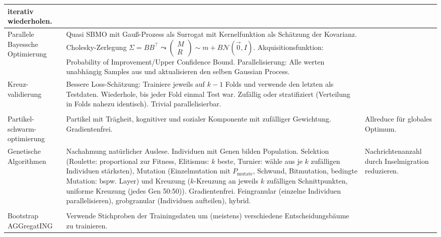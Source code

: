\documentclass[11pt]{scrartcl}
\begin{document}
\begin{xltabular}{\linewidth}{p{25mm}|p{70mm}p{35mm}}
        iterativ wiederholen. &
        \\
    \hline
    Parallele Bayessche Optimierung &
        Quasi SBMO mit Gauß-Prozess als Surrogat mit Kernelfunktion als Schätzung der 
        Kovarianz. Cholesky-Zerlegung $\Sigma = B B^\top \leadsto \begin{pmatrix}
            M \\ R
        \end{pmatrix} \sim m + B \mathcal{N}(\vec{0}, I)$. Akquisitionsfunktion: Probability of 
        Improvement/Upper Confidence Bound. Parallelisierung: Alle werten unabhängig Samples aus
        und aktualisieren den selben Gaussian Process. & 
        \\
    \hline
    Kreuz-validierung &
        Bessere Loss-Schätzung: Trainiere jeweils auf $k - 1$ Folds und verwende den letzten
        als Testdaten. Wiederhole, bis jeder Fold einmal Test war. Zufällig oder stratifiziert
        (Verteilung in Folds nahezu identisch). Trivial parallelisierbar. &
        \\
    \hline
    & \vspace{-1em} & \\ \hline
    Partikel-schwarm-optimierung &
        Partikel mit Trägheit, kognitiver und sozialer Komponente mit zufälliger Gewichtung.
        Gradientenfrei. &
        Allreduce für globales Optimum. \\
    \hline
    Genetische Algorithmen &
        Nachahmung natürlicher Auslese. Individuen mit Genen bilden Population. Selektion
        (Roulette: proportional zur Fitness, Elitismus: $k$ beste, Turnier: wähle aus je $k$ 
        zufälligen Individuen stärksten), Mutation (Einzelmutation mit $P_\mathrm{mutate}$,
        Schwund, Bitmutation, bedingte Mutation: bspw. Layer) und Kreuzung ($k$-Kreuzung an 
        jeweils $k$ zufälligen Schnittpunkten, uniforme Kreuzung (jedes Gen 50:50)). 
        Gradientenfrei. Feingranular (einzelne Individuen parallelisieren), grobgranular 
        (Individuen aufteilen), hybrid. &
        Nachrichtenanzahl durch Inselmigration reduzieren. \\
    \hline
    & \vspace{-1em} & \\ \hline
    Bootstrap AGGregatING &
        Verwende Stichproben der Trainingsdaten um (meistens) verschiedene Entscheidungsbäume 
        zu trainieren. &
        \\

\end{xltabular}
\end{document}
